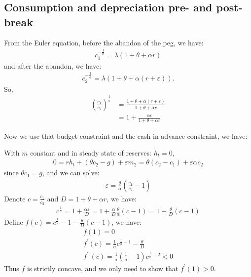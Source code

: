 \documentclass[a4paper,12pt]{article} %
\theoremstyle{nonitalic}
\begin{document}
\subsection{Consumption and depreciation pre- and post-break}\label{sec:1.3}
From the Euler equation, before the abandon of the peg, we have:
\begin{gather*}
    c_1^{-\frac{1}{\sigma}} = \lambda (1 + \theta + \alpha r)
\end{gather*}
and after the abandon, we have:
\begin{gather*}
    c_2^{-\frac{1}{\sigma}} = \lambda (1 + \theta + \alpha (r+\varepsilon)).
\end{gather*}
So,
\begin{align*}
    \left(\frac{c_1}{c_2}\right)^{\frac{1}{\sigma}} &= \frac{1+\theta + \alpha (r+\varepsilon)}{1 + \theta + \alpha r} \\
    &= 1 + \frac{\alpha \epsilon}{1 + \theta  + \alpha r}
\end{align*}


Now we use that budget constraint and the cash in advance constraint, we have:

With $m$ constant and in steady state of reserves: $\dot{h}_t = 0$,
\begin{gather*}
    0 = r h_t + (\theta c_2 - g) + \varepsilon m_2 = \theta (c_2 - c_1 ) + \varepsilon \alpha c_2
\end{gather*}
since $\theta c_1 = g$, and we can solve:
\begin{gather*}
    \varepsilon  = \frac{\theta}{\alpha} \left( \frac{c_1}{c_2} - 1 \right)
\end{gather*}
Denote $c =  \frac{c_1}{c_2}$ and $D = 1 + \theta + \alpha r$, we have:
\begin{gather*}
    c^{\frac{1}{\sigma}} = 1 + \frac{\alpha \varepsilon}{D} = 1 + \frac{\alpha }{D} \frac{\theta}{\alpha}(c-1) = 1 + \frac{\theta}{D} (c-1)
\end{gather*}
Define $f(c) = c^{\frac{1}{\sigma}} - 1 - \frac{\theta}{D}(c-1)$,
we have:
\begin{gather*}
    f(1) = 0 \\
    f^{\prime} (c) = \frac{1}{\sigma} c^{\frac{1}{\sigma}-1} - \frac{\theta}{D} \\
    f^{\prime \prime} (c) = \frac{1}{\sigma} \left( \frac{1}{\sigma}-1 \right) c^{\frac{1}{\sigma}-2} < 0
\end{gather*}
Thus $f$ is strictly concave, and we only need to show that $f^{\prime}(1) > 0$.
\end{document}
